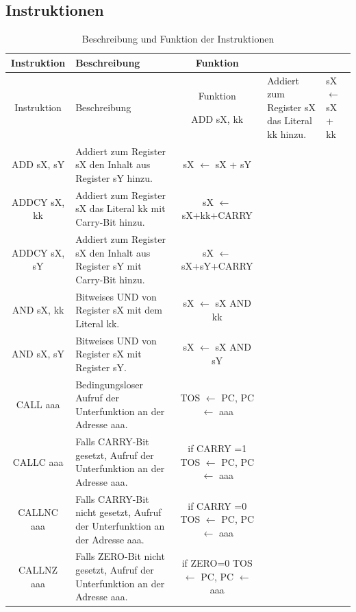 \documentclass[bibliography=totoc,listof=totoc,index=totoc]{scrartcl}
\begin{document}
\begin{small}
\begin{longtable}{||c|p{4cm}|p{10cm}||}
    \end{longtable}

\end{small}
\newpage
\subsection{Instruktionen}\label{sec:Instruktionen}

\begin{small}
    \begin{longtable}{||c|p{6.5cm}|c||}
        \hline \hline
         Instruktion & Beschreibung & Funktion  \endfirsthead
         \caption{Beschreibung und Funktion der Instruktionen}\\
         \hline \hline
         Instruktion & Beschreibung & Funktion \endhead \caption[]{Beschreibung und Funktion der Instruktionen}\endfoot
         \hline
         ADD sX, kk & Addiert zum Register sX das Literal kk hinzu. & sX $\leftarrow$ sX + kk  \\ \hline
         ADD sX, sY & Addiert zum Register sX den Inhalt aus Register sY hinzu. & sX $\leftarrow$ sX + sY   \\ \hline
         ADDCY sX, kk & Addiert zum Register sX das Literal kk mit Carry-Bit hinzu. &sX $\leftarrow$ sX+kk+CARRY   \\ \hline
         ADDCY sX, sY & Addiert zum Register sX den Inhalt aus Register sY mit Carry-Bit hinzu. & sX $\leftarrow$ sX+sY+CARRY  \\ \hline
         AND sX, kk & Bitweises UND von Register sX mit dem Literal kk. & sX $\leftarrow$ sX AND kk  \\ \hline
         AND sX, sY & Bitweises UND von Register sX mit Register sY. & sX $\leftarrow$ sX AND sY  \\ \hline
          CALL aaa & Bedingungsloser Aufruf der Unterfunktion an der Adresse aaa. &TOS $\leftarrow$ PC, PC $\leftarrow$ aaa  \\ \hline
         CALLC aaa & Falls CARRY-Bit gesetzt, Aufruf der Unterfunktion an der Adresse aaa. &if CARRY =1 {TOS $\leftarrow$ PC, PC $\leftarrow$ aaa}  \\ \hline
         CALLNC aaa & Falls CARRY-Bit nicht gesetzt, Aufruf der Unterfunktion an der Adresse aaa. &if CARRY =0 {TOS $\leftarrow$ PC, PC $\leftarrow$ aaa} \\ \hline
         CALLNZ aaa & Falls ZERO-Bit nicht gesetzt, Aufruf der Unterfunktion an der Adresse aaa. &if ZERO=0 {TOS $\leftarrow$ PC, PC $\leftarrow$ aaa}  \\ \hline

\end{longtable}
\end{small}
\end{document}

